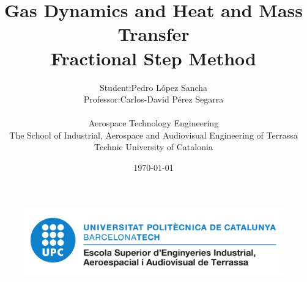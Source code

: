 
\title{
    \LARGE
    \textbf{Gas Dynamics and Heat and Mass Transfer}\\
    \textbf{\large{Fractional Step Method}}\\
}

\author{
    \begin{tabular}{rl}
    	\vspace{4mm}
        Student: 		& Pedro López Sancha 			\\
        Professor:  	& Carlos-David Pérez Segarra 	\\
    \end{tabular}
    \vspace{1cm} \\
    Aerospace Technology Engineering \\
    \vspace{0.1cm}
    The School of Industrial, Aerospace and Audiovisual Engineering of Terrassa \\
    \vspace{0.1cm}
    Technic University of Catalonia \\
    \vspace{0.5cm} 
}

\date{\today}

\begin{titlepage}
	\vspace*{\fill}
    \begin{center}
        \thetitle
        \vspace{1cm}
        \large{\theauthor}
        \thedate
    \end{center}
	\begin{figure}[ht]
		\centering
		\includegraphics[width=0.6\linewidth]{figures/general/logo_eseiaat.pdf}
	\end{figure}
    \vspace*{\fill}
\end{titlepage}


